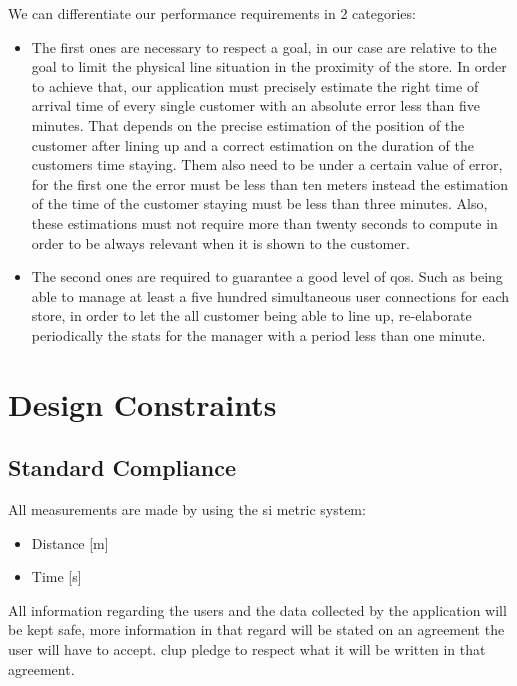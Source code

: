 We can differentiate our performance requirements in 2 categories:
\begin{itemize}
	\item The first ones are necessary to respect a goal, in our case are relative to the goal to limit the physical line situation in the proximity of the store. In 			order to achieve that, our application must precisely estimate the right time of arrival time of every single customer with an absolute error less than five 			minutes. That depends on the precise estimation of the position of the customer after lining up and a correct estimation on the duration of the customers time staying. Them also need to be under a certain value of error, for the first one the error must be less than ten meters instead the estimation of the time 	of the customer staying must be less than three minutes. Also, these estimations must not require more than twenty seconds to compute in order to be always relevant when it is shown to the customer.
	\item The second ones are required to guarantee a good level of \gls{qos}. Such as being able to manage at least a five hundred simultaneous user connections for each store, in order to let the all customer being able to line up, re-elaborate periodically the stats for the manager with a period less than one minute.

\end{itemize}
	

\section{Design Constraints}

\subsection{Standard Compliance}

All measurements are made by using the \gls{si} metric system: 
\begin{itemize}
	\item Distance [m] \\
	\item Time [s] \\
\end{itemize} 
All information regarding the users and the data collected by the application will be kept safe, more information in that regard will be stated on an agreement the user will have to accept. \gls{clup} pledge to respect what it will be written in that agreement. \\

